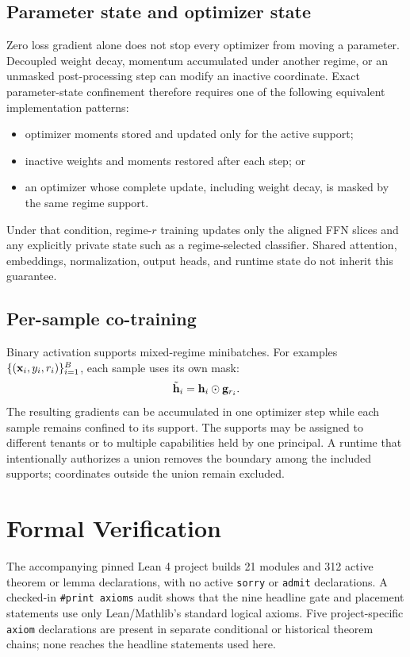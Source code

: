 \documentclass[11pt]{article}
\begin{document}
\subsection{Parameter state and optimizer state}

Zero loss gradient alone does not stop every optimizer from moving a parameter.
Decoupled weight decay, momentum accumulated under another regime, or an
unmasked post-processing step can modify an inactive coordinate. Exact
parameter-state confinement therefore requires one of the following equivalent
implementation patterns:
\begin{itemize}
  \item optimizer moments stored and updated only for the active support;
  \item inactive weights and moments restored after each step; or
  \item an optimizer whose complete update, including weight decay, is masked
  by the same regime support.
\end{itemize}

Under that condition, regime-$r$ training updates only the aligned FFN slices
and any explicitly private state such as a regime-selected classifier. Shared
attention, embeddings, normalization, output heads, and runtime state do not
inherit this guarantee.

\subsection{Per-sample co-training}

Binary activation supports mixed-regime minibatches. For examples
$\{(\mathbf{x}_i,y_i,r_i)\}_{i=1}^B$, each sample uses its own mask:
\begin{equation}
  \tilde{\mathbf{h}}_i=\mathbf{h}_i\odot\mathbf{g}_{r_i}.
\end{equation}
The resulting gradients can be accumulated in one optimizer step while each
sample remains confined to its support. The supports may be assigned to
different tenants or to multiple capabilities held by one principal. A runtime
that intentionally authorizes a union removes the boundary among the included
supports; coordinates outside the union remain excluded.

\section{Formal Verification}

The accompanying pinned Lean 4 project builds 21 modules and 312 active theorem or
lemma declarations, with no active \texttt{sorry} or \texttt{admit}
declarations. A checked-in \texttt{\#print axioms} audit shows that the nine
headline gate and placement statements use only Lean/Mathlib's standard
logical axioms. Five project-specific \texttt{axiom} declarations are present
in separate conditional or historical theorem chains; none reaches the
headline statements used here.
\end{document}
